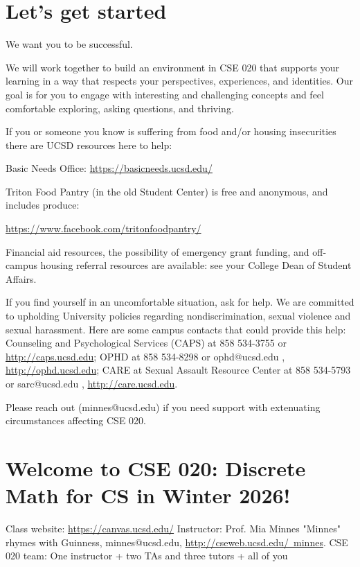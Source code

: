 \documentclass[12pt, oneside]{article}
\begin{document}
\begin{flushright}
\end{flushright} \section*{Let's get started}


We want you to be successful. 

We will work together to build an 
environment in CSE 020 that supports your learning
in a way that respects your
perspectives, experiences, and identities.
Our goal is for you to  engage
with interesting and challenging concepts and 
feel comfortable exploring, asking questions, and thriving.

If you or someone you know is suffering from food and/or housing insecurities 
there are UCSD resources here to help:

Basic Needs Office: \href{https://basicneeds.ucsd.edu/}{https://basicneeds.ucsd.edu/}

Triton Food Pantry (in the old Student Center)
is free and anonymous, and includes produce: 

\href{https://www.facebook.com/tritonfoodpantry/}{https://www.facebook.com/tritonfoodpantry/}

Financial aid resources, the possibility of emergency grant funding, and off-campus housing referral 
resources are available: see your College Dean of Student Affairs.

If you find yourself in an uncomfortable situation, ask for help. 
We are committed to upholding University policies regarding nondiscrimination, sexual violence and sexual harassment.
Here are some campus contacts that could provide this help: 
Counseling and Psychological Services (CAPS) at 858 534-3755 or \href{http://caps.ucsd.edu}{http://caps.ucsd.edu}; 
OPHD at 858 534-8298 or ophd@ucsd.edu , \href{http://ophd.ucsd.edu}{http://ophd.ucsd.edu};
CARE at Sexual Assault Resource Center at 858 534-5793 or sarc@ucsd.edu , \href{http://care.ucsd.edu}{http://care.ucsd.edu}.

Please reach out (minnes@ucsd.edu) if you need support with extenuating circumstances affecting CSE 020.

\vfill

\newpage
\section*{Welcome to CSE 020: Discrete Math for CS in Winter 2026!}
Class website: \href{https://canvas.ucsd.edu//}{https://canvas.ucsd.edu/}
Instructor: Prof. Mia Minnes {\tiny{"Minnes" rhymes with Guinness}}, minnes@ucsd.edu, 
\href{http://cseweb.ucsd.edu/~minnes}{http://cseweb.ucsd.edu/~minnes}.
CSE 020 team: One instructor + two TAs and three tutors + all of you
\end{document}
